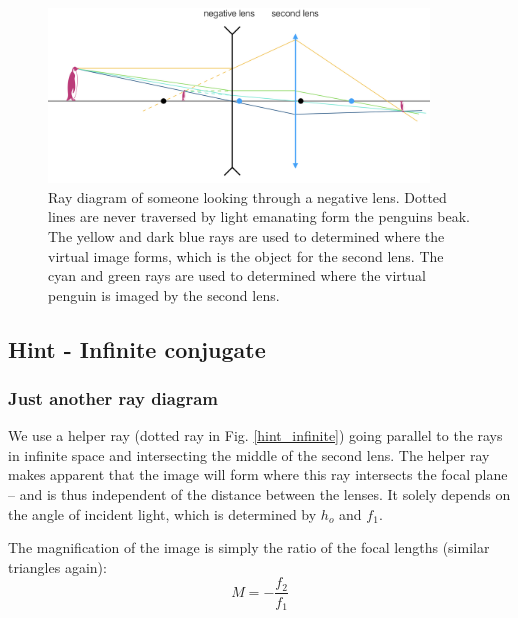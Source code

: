 \documentclass[a4paper]{report}
\begin{document}
    
	\begin{figure}[h]
		\center
		\includegraphics[width=0.9\textwidth]{figures/negative_lens.png}
		\captionsetup{width=0.9\textwidth}
		\caption{Ray diagram of someone looking through a negative lens. Dotted lines are never traversed by light emanating form the penguins beak. The yellow and dark blue rays are used to determined where the virtual image forms, which is the object for the second lens. The cyan and green rays are used to determined where the virtual penguin is imaged by the second lens.}
		\label{fig:neglens}
	\end{figure}
	
	
    \clearpage
    
    
    \subsection{Hint - Infinite conjugate}
	\hypertarget{hintTo-infinite}{}
	
	\subsubsection{Just another ray diagram}
	We use a helper ray (dotted ray in Fig. \ref{hint_infinite}) going parallel to the rays in infinite space and intersecting the middle of the second lens. The helper ray makes apparent that the image will form where this ray intersects the focal plane -- and is thus independent of the distance between the lenses. It solely depends on the angle of incident light, which is determined by $h_o$ and $f_1$.
	
	The magnification of the image is simply the ratio of the focal lengths (similar triangles again): 
	\begin{equation}
	M=-\frac{f_2}{f_1}
	\label{eq:magIC}
	\end{equation}
	
\end{document}
